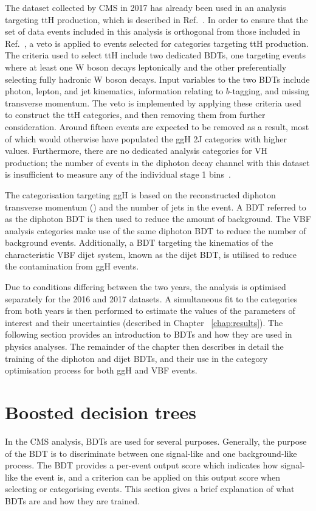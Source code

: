 The dataset collected by CMS in 2017 has already been used in an analysis targeting ttH production,
which is described in Ref.~\cite{HIG-18-018}.
In order to ensure that the set of data events included in this analysis is orthogonal 
from those included in Ref.~\cite{HIG-18-018}, 
a veto is applied to events selected for categories targeting ttH production.
The criteria used to select ttH include two dedicated BDTs, 
one targeting events where at least one W boson decays leptonically
and the other preferentially selecting fully hadronic W boson decays.
Input variables to the two BDTs include photon, lepton, and jet kinematics, 
information relating to $b$-tagging, and missing transverse momentum.
The veto is implemented by applying these criteria used to construct the ttH categories, 
and then removing them from further consideration. 
Around fifteen events are expected to be removed as a result, 
most of which would otherwise have populated the ggH 2J categories with higher \ptH values.
Furthermore, there are no dedicated analysis categories for VH production; 
the number of events in the diphoton decay channel with this dataset 
is insufficient to measure any of the individual stage 1 bins~\cite{YR4}.

The categorisation targeting ggH is based on the reconstructed diphoton transverse momentum (\ptgg) 
and the number of jets in the event. 
A BDT referred to as the diphoton BDT is then used to reduce the amount of background. 
The VBF analysis categories make use of the same diphoton BDT 
to reduce the number of background events. 
Additionally, a BDT targeting the kinematics of the characteristic VBF dijet system, 
known as the dijet BDT, is utilised to reduce the contamination from ggH events.

Due to conditions differing between the two years, 
the analysis is optimised separately for the 2016 and 2017 datasets. 
A simultaneous fit to the categories from both years is then performed to estimate the 
values of the parameters of interest and their uncertainties (described in Chapter ~\ref{chap:results}).
The following section provides an introduction to BDTs and how they are used in physics analyses.
The remainder of the chapter then describes in detail the training of the diphoton and dijet BDTs, 
and their use in the category optimisation process for both ggH and VBF events.

\section{Boosted decision trees}
\label{sec:BDTs}
In the CMS \Hgg analysis, BDTs are used for several purposes.
Generally, the purpose of the BDT is to discriminate between 
one signal-like and one background-like process.
The BDT provides a per-event output score which indicates how signal-like the event is, 
and a criterion can be applied on this output score when selecting or categorising events.
This section gives a brief explanation of what BDTs are and how they are trained.

